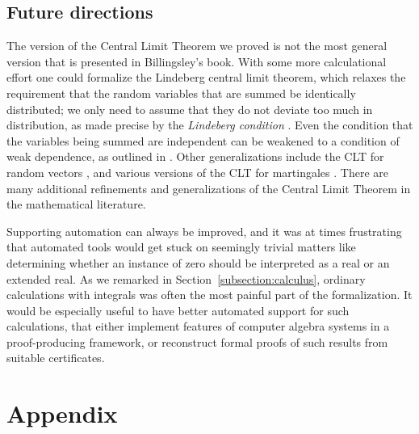 \documentclass{svjour3}
\begin{document}
\subsection{Future directions}

The version of the Central Limit Theorem we proved is not the most general version that is presented in Billingsley's book. With some more calculational effort one could formalize the Lindeberg central limit theorem, which relaxes the requirement that the random variables that are summed be identically distributed; we only need to assume that they do not deviate too much in distribution, as made precise by the {\em Lindeberg condition} \cite[p.~359]{billingsley:95}. Even the condition that the variables being summed are independent can be weakened to a condition of weak dependence, as outlined in \cite[p.~363]{billingsley:95}. Other generalizations include the CLT for random vectors \cite[p.~385]{billingsley:95}, and various versions of the CLT for martingales \cite[pp.~475--478]{billingsley:95}. There are many additional refinements and generalizations of the Central Limit Theorem in the mathematical literature.

Supporting automation can always be improved, and it was at times frustrating that automated tools would get stuck on seemingly trivial matters like determining whether an instance of zero should be interpreted as a real or an extended real. As we remarked in Section~\ref{subsection:calculus}, ordinary calculations with integrals was often the most painful part of the formalization. It would be especially useful to have better automated support for such calculations, that either implement features of computer algebra systems in a proof-producing framework, or reconstruct formal proofs of such results from suitable certificates.




\section*{Appendix}
\end{document}
